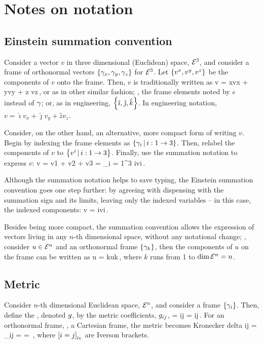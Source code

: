 \section{Notes on notation}

\subsection{Einstein summation convention}
Consider a vector $v$ in three dimensional (Euclidean) space, $\mathcal{\mathcal{E}}^{3}$, and consider a frame of orthonormal vectors $\left\lbrace{\gamma_{x}, \gamma_{y}, \gamma_{z}}\right\rbrace$ for $\mathcal{\mathcal{E}}^{3}$. Let $\left\lbrace{{v}^{x}, {v}^{y}, {v}^{z}}\right\rbrace$ be the components of $v$ onto the frame. Then, $v$ is traditionally written as
\beq
v = \fbvec x\fvec vx + \fbvec y\fvec vy + \fbvec z \fvec vz\,,
\eeq
or as in other similar fashion; \eg, the frame elements noted by $e$ instead of $\gamma_{}$; or, as in engineering, $\left\lbrace{\hat\imath, \hat\jmath, \hat k}\right\rbrace$. In engineering notation, $v = \hat{\imath}v_x + \hat{\jmath}v_y + \hat{z}v_z$.

Consider, on the other hand, an alternative, more compact form of writing $v$. Begin by indexing the frame elements as $\left\lbrace{{\gamma_{i}}\,|\,{i:1\to 3}}\right\rbrace$. Then, relabel the components of $v$ to $\left\lbrace{{{v}^{i}}\,|\,{i:1\to 3}}\right\rbrace$. Finally, use the summation notation to express $v$:
\beq
v = \fvec v1 + \fvec v2 + \fvec v3 
  = \sum_{i = 1}^3 \fbvec i\fvec vi\,.
\eeq

Although the summation notation helps to save typing, the Einstein summation convention goes one step further: by agreeing with dispensing with the summation sign and its limits, leaving only the indexed variables -- in this case, the indexed components:
\beq
v = \fbvec i\fvec vi\,.
\eeq

Besides being more compact, the summation convention allows the expression of vectors living in any $n$-th dimensional space, without any notational change; \eg, consider $u\in\mathcal{\mathcal{E}}^{n}$ and an orthonormal frame $\left\lbrace{\gamma_{k}}\right\rbrace$, then the components of $u$ on the frame can be written as
\beq
u = \fbvec k\fvec uk\,,
\eeq
where $k$ runs from 1 to $\dim\mathcal{\mathcal{E}}^{n} = n$.


\subsection{Metric}
Consider $n$-th dimensional Euclidean space, $\mathcal{\mathcal{E}}^{n}$, and consider a frame $\left\lbrace{\gamma_{i}}\right\rbrace$. Then, define the , denoted $g$, by the metric coefficients, $g_{{i}{j}}$,
\beq
\metric = \fmet ij = \fbvec i\iprod\fbvec j\,.
\eeq
For an orthonormal frame, \eg, a Cartesian frame, the metric becomes Kronecker delta
\beq
\fmet ij = \delta_{ij} = \diag{} = \,,
\eeq
where $\left[i = j\right]_\text{iv}$ are Iverson brackets.


